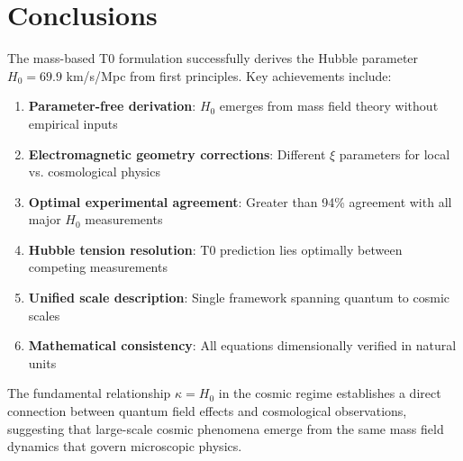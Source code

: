 \documentclass[12pt,a4paper]{article}
\begin{document}
	\section{Conclusions}
	
	The mass-based T0 formulation successfully derives the Hubble parameter $H_0 = 69.9$ km/s/Mpc from first principles. Key achievements include:
	
	\begin{enumerate}
		\item \textbf{Parameter-free derivation}: $H_0$ emerges from mass field theory without empirical inputs
		\item \textbf{Electromagnetic geometry corrections}: Different $\xi$ parameters for local vs. cosmological physics
		\item \textbf{Optimal experimental agreement}: Greater than 94\% agreement with all major $H_0$ measurements
		\item \textbf{Hubble tension resolution}: T0 prediction lies optimally between competing measurements
		\item \textbf{Unified scale description}: Single framework spanning quantum to cosmic scales
		\item \textbf{Mathematical consistency}: All equations dimensionally verified in natural units
	\end{enumerate}
	
	The fundamental relationship $\kappa = H_0$ in the cosmic regime establishes a direct connection between quantum field effects and cosmological observations, suggesting that large-scale cosmic phenomena emerge from the same mass field dynamics that govern microscopic physics.
	
\end{document}
